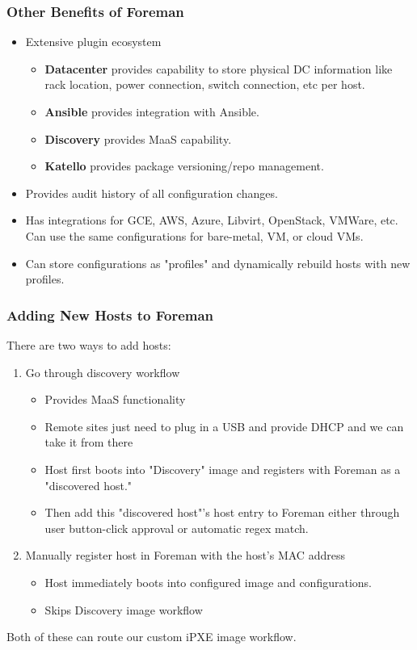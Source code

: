 \documentclass{beamer}
\begin{document}
\begin{frame}
	\frametitle{Other Benefits of Foreman}
	\begin{itemize}
		\item Extensive plugin ecosystem
		      \begin{itemize}
			      \item \textbf{Datacenter} provides capability to store physical DC information like rack location, power connection, switch connection, etc per host.
			      \item \textbf{Ansible} provides integration with Ansible.
			      \item \textbf{Discovery} provides MaaS capability.
			      \item \textbf{Katello} provides package versioning/repo management.
		      \end{itemize}
		\item Provides audit history of all configuration changes.
		\item Has integrations for GCE, AWS, Azure, Libvirt, OpenStack, VMWare, etc. Can use the same configurations for bare-metal, VM, or cloud VMs.
		\item Can store configurations as "profiles" and dynamically rebuild hosts with new profiles.
	\end{itemize}
\end{frame}

\begin{frame}
	\frametitle{Adding New Hosts to Foreman}
	There are two ways to add hosts:
	\begin{enumerate}
		\item Go through discovery workflow
		      \begin{itemize}
			      \item Provides MaaS functionality
			      \item Remote sites just need to plug in a USB and provide DHCP and we can take it from there
			      \item Host first boots into "Discovery" image and registers with Foreman as a "discovered host."
			      \item Then add this "discovered host"'s host entry to Foreman either through user button-click approval or automatic regex match.
		      \end{itemize}
		\item Manually register host in Foreman with the host's MAC address
		      \begin{itemize}
			      \item Host immediately boots into configured image and configurations.
			      \item Skips Discovery image workflow
		      \end{itemize}
	\end{enumerate}
	Both of these can route our custom iPXE image workflow.
\end{frame}
\end{document}
